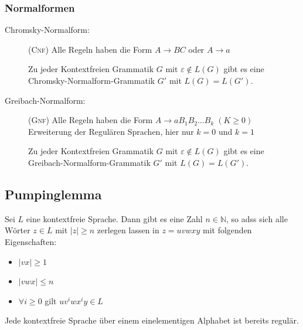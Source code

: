 \documentclass{scrartcl}
\begin{document}
\subsubsection*{Normalformen}
\begin{description}
    \item[Chromsky-Normalform:] (\textsc{Cnf}) Alle Regeln haben die Form $A\to BC$ oder $A\to a$
    \begin{shaded}
        Zu jeder Kontextfreien Grammatik $G$ mit $\varepsilon\not\in L(G)$ gibt es eine Chromsky-Normalform-Grammatik $G'$ mit $L(G) = L(G')$.
    \end{shaded}
    \item[Greibach-Normalform:] (\textsc{Gnf}) Alle Regeln haben die Form $A\to aB_1B_2\dots B_k\; (K\geq0)$ \\ {\tiny Erweiterung der Regulären Sprachen, hier nur $k=0$ und $k=1$}
    \begin{shaded}
        Zu jeder Kontextfreien Grammatik $G$ mit $\varepsilon\not\in L(G)$ gibt es eine Greibach-Normalform-Grammatik $G'$ mit $L(G) = L(G')$.
    \end{shaded}
\end{description}

\subsection*{Pumpinglemma}
\begin{shaded}
    Sei $L$ eine kontextfreie Sprache. Dann gibt es eine Zahl $n\in \mathds{N}$, so adss sich alle Wörter $z\in L$ mit $|z|\geq n$ zerlegen lassen in $z=uvwxy$ mit folgenden Eigenschaften:
    \begin{itemize}
        \item $|vx|\geq 1$
        \item $|vwx|\leq n$
        \item $\forall i\geq0$ gilt $uv^iwx^iy\in L$
    \end{itemize}
    Jede kontextfreie Sprache über einem einelementigen Alphabet ist bereits regulär.
\end{shaded}
\end{document}
